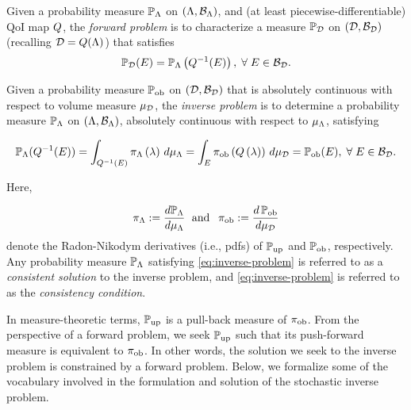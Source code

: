 \begin{defn}\label{defn:forward-problem}
  Given a probability measure $\mathbb{P}_{\Lambda}$ on $({\Lambda}, \mathcal{B}_{{\Lambda}})$, and (at least piecewise-differentiable) QoI map $Q$, the \emph{forward problem} is to characterize a measure $\mathbb{P}_{\mathcal{D}}$ on $(\mathcal{D}, \mathcal{B}_{\mathcal{D}})$ (recalling $\mathcal{D} = Q({\Lambda})$) that satisfies
  \begin{equation}\label{eq:forward-problem}
    \mathbb{P}_{\mathcal{D}} (E) = \mathbb{P}_{\Lambda} \left ( Q^{-1}(E) \right ), \; \forall \; E \in \mathcal{B}_{\mathcal{D}}.
  \end{equation}
\end{defn}

\begin{defn}\label{defn:inverse-problem}
  Given a probability measure $\operatorname*{\mathbb{P}_{ob}}$ on $(\mathcal{D}, \mathcal{B}_{\mathcal{D}})$ that is absolutely continuous with respect to volume measure $\mu_{\mathcal{D}}$, the \emph{inverse problem} is to determine a probability measure $\mathbb{P}_{\Lambda}$ on $({\Lambda}, \mathcal{B}_{{\Lambda}})$, absolutely continuous with respect to $\mu_{{\Lambda}}$, satisfying

  \begin{equation}\label{eq:inverse-problem}
    \mathbb{P}_{\Lambda} (Q^{-1}(E)) = \int_{Q^{-1}(E)} \pi_{\Lambda} \left ( \lambda \right ) \, d\mu_{{\Lambda}} = \int_E \operatorname*{\pi_{ob}} \left ( Q\left ( \lambda \right ) \right ) \, d\mu_{\mathcal{D}} = \operatorname*{\mathbb{P}_{ob}}(E), \; \forall \; E \in \mathcal{B}_{\mathcal{D}}.
  \end{equation} 

  \noindent Here,
   
  \begin{equation*}
    \pi_{\Lambda} := \frac{d\mathbb{P}_{\Lambda}}{d\mu_{{\Lambda}}} \;\text{ and }\; \operatorname*{\pi_{ob}} := \frac{d\operatorname*{\mathbb{P}_{ob}}}{d\mu_{\mathcal{D}}}
  \end{equation*}
  denote the Radon-Nikodym derivatives (i.e., pdfs) of $\operatorname*{\mathbb{P}_{up}}$ and $\operatorname*{\mathbb{P}_{ob}}$, respectively. 
  Any probability measure $\mathbb{P}_{\Lambda}$ satisfying \eqref{eq:inverse-problem} is referred to as a \emph{consistent solution} to the inverse problem, and \eqref{eq:inverse-problem} is referred to as the \emph{consistency condition}.
\end{defn}

In measure-theoretic terms, $\operatorname*{\mathbb{P}_{up}}$ is a pull-back measure of $\operatorname*{\pi_{ob}}$.
From the perspective of a forward problem, we seek $\operatorname*{\mathbb{P}_{up}}$ such that its push-forward measure is equivalent to $\operatorname*{\pi_{ob}}$. 
In other words, the solution we seek to the inverse problem is constrained by a forward problem. 
Below, we formalize some of the vocabulary involved in the formulation and solution of the stochastic inverse problem.

